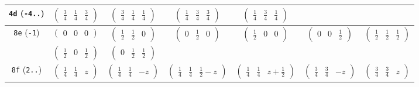\documentclass[fleqn,9pt,landscape]{jsarticle}
\begin{document}
\begin{center}
\begin{longtable}{ccccccc}
{\tt 4d} ({\tt -4..}) & $ \begin{pmatrix} \frac{3}{4} & \frac{1}{4} & \frac{3}{4} \end{pmatrix} $ & $ \begin{pmatrix} \frac{3}{4} & \frac{1}{4} & \frac{1}{4} \end{pmatrix} $ & $ \begin{pmatrix} \frac{1}{4} & \frac{3}{4} & \frac{3}{4} \end{pmatrix} $ & $ \begin{pmatrix} \frac{1}{4} & \frac{3}{4} & \frac{1}{4} \end{pmatrix} $ & $  $ & $  $ \\ \hline
{\tt 8e} ({\tt -1}) & $ \begin{pmatrix} 0 & 0 & 0 \end{pmatrix} $ & $ \begin{pmatrix} \frac{1}{2} & \frac{1}{2} & 0 \end{pmatrix} $ & $ \begin{pmatrix} 0 & \frac{1}{2} & 0 \end{pmatrix} $ & $ \begin{pmatrix} \frac{1}{2} & 0 & 0 \end{pmatrix} $ & $ \begin{pmatrix} 0 & 0 & \frac{1}{2} \end{pmatrix} $ & $ \begin{pmatrix} \frac{1}{2} & \frac{1}{2} & \frac{1}{2} \end{pmatrix} $ \\
& $ \begin{pmatrix} \frac{1}{2} & 0 & \frac{1}{2} \end{pmatrix} $ & $ \begin{pmatrix} 0 & \frac{1}{2} & \frac{1}{2} \end{pmatrix} $ & $  $ & $  $ & $  $ & $  $ \\ \hline
{\tt 8f} ({\tt 2..}) & $ \begin{pmatrix} \frac{1}{4} & \frac{1}{4} & z \end{pmatrix} $ & $ \begin{pmatrix} \frac{1}{4} & \frac{1}{4} & - z \end{pmatrix} $ & $ \begin{pmatrix} \frac{1}{4} & \frac{1}{4} & \frac{1}{2} - z \end{pmatrix} $ & $ \begin{pmatrix} \frac{1}{4} & \frac{1}{4} & z + \frac{1}{2} \end{pmatrix} $ & $ \begin{pmatrix} \frac{3}{4} & \frac{3}{4} & - z \end{pmatrix} $ & $ \begin{pmatrix} \frac{3}{4} & \frac{3}{4} & z \end{pmatrix} $ \\

\end{longtable}
\end{center}
\end{document}
